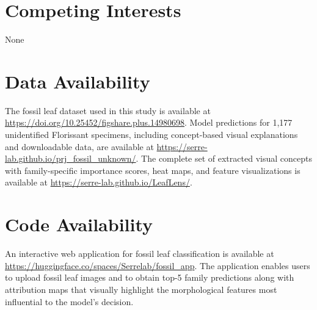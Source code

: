 \documentclass[pdflatex,lineno,sn-nature]{sn-jnl}%
\theoremstyle{plain}%
\theoremstyle{definition}%
\theoremstyle{remark}%
\begin{document}
\section*{Competing Interests}
None
\section*{Data Availability}
The fossil leaf dataset used in this study is available at \url{https://doi.org/10.25452/figshare.plus.14980698}. Model predictions for 1,177 unidentified Florissant specimens, including concept-based visual explanations and downloadable data, are available at \url{https://serre-lab.github.io/prj_fossil_unknown/}.  The complete set of extracted visual concepts with family-specific importance scores, heat maps, and feature visualizations is available at \url{https://serre-lab.github.io/LeafLens/}.

\section*{Code Availability}
An interactive web application for fossil leaf classification is available at \url{https://huggingface.co/spaces/Serrelab/fossil_app}. The application enables users to upload fossil leaf images and to obtain top-5 family predictions along with attribution maps that visually highlight the morphological features most influential to the model's decision.


\clearpage



\setcounter{figure}{0}
\renewcommand{\thefigure}{S\arabic{figure}}
\setcounter{table}{0}
\renewcommand{\thetable}{S\arabic{table}}
\setcounter{equation}{0}
\renewcommand{\theequation}{S\arabic{equation}}
\setcounter{section}{0}
\renewcommand{\thesection}{S\arabic{section}}
\end{document}
